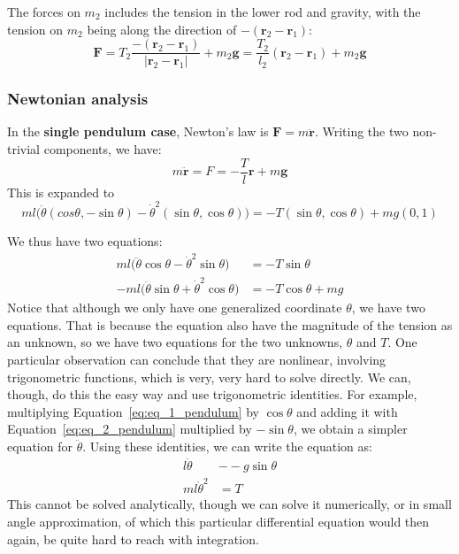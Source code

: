 The forces on $m_{2}$ includes the tension in the lower rod and gravity, with the tension on $m_{2}$ being along the direction of $-(\mathbf{r}_{2}-\mathbf{r}_{1})$: 
\begin{equation}
  \mathbf{F} = T_{2} \frac{-(\mathbf{r}_{2}-\mathbf{r}_{1})}{\lvert \mathbf{r}_{2}-\mathbf{r}_{1}\rvert} + m_{2}\mathbf{g} = \frac{T_{2}}{l_{2}} (\mathbf{r}_{2}-\mathbf{r}_{1}) + m_{2}\mathbf{g}
\end{equation}

\subsubsection{Newtonian analysis}
In the \textbf{single pendulum case}, Newton's law is $\mathbf{F}=m\ddot{\mathbf{r}}$. Writing the two non-trivial components, we have: 
\begin{equation}
  m\ddot{\mathbf{r}} = F = -\frac{T}{l}\mathbf{r} + m\mathbf{g}
\end{equation}
This is expanded to
\begin{equation}
  ml\Big( \ddot{\theta} (cos{\theta},-\sin{\theta}) - \dot{\theta}^{2}(\sin{\theta},\cos{\theta})  \Big) = -T (\sin{\theta},\cos{\theta}) + mg(0,1)
\end{equation}

We thus have two equations: 
\begin{align}
  ml\Big(\ddot{\theta}\cos{\theta}-\dot{\theta}^{2}\sin{\theta}\Big) & = -T\sin{\theta}\label{eq:eq_1_pendulum}\\
  -ml \Big(\ddot{\theta}\sin{\theta}+ \dot{\theta}^{2}\cos{\theta}\Big) & = -T\cos{\theta} + mg\label{eq:eq_2_pendulum}
\end{align}
Notice that although we only have one generalized coordinate $\theta$, we have two equations. That is because the equation also have the magnitude of the tension as an unknown, so we have two equations for the two unknowns, $\theta$ and $T$. One particular observation can conclude that they are nonlinear, involving trigonometric functions, which is very, very hard to solve directly. We can, though, do this the easy way and use trigonometric identities. For example, multiplying Equation~\ref{eq:eq_1_pendulum} by $\cos{\theta}$ and adding it with Equation~\ref{eq:eq_2_pendulum} multiplied by $-\sin{\theta}$, we obtain a simpler equation for $\ddot{\theta}$. Using these identities, we can write the equation as: 
\begin{align}
  l\ddot{\theta} & - -g\sin{\theta}\\
  ml\dot{\theta}^{2} & = T
\end{align}
This cannot be solved analytically, though we can solve it numerically, or in small angle approximation, of which this particular differential equation would then again, be quite hard to reach with integration. 

